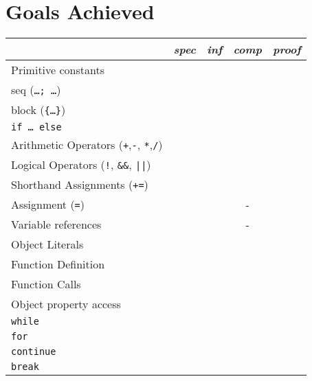 \documentclass{article}
\begin{document}
	\section{Goals Achieved}

	\begin{table}[ht]
		\begin{tabular}{lcccc}
		                                  & \textit{spec} & \textit{inf} & \textit{comp} &  \textit{proof} \\ 
		\hline
		Primitive constants               & \checkmark{}  & \checkmark{} & \checkmark{}  &  \checkmark{}   \\
		seq (\texttt{\ldots; \ldots})     & \checkmark{}  & \checkmark{} & \checkmark{}  &  \checkmark{}   \\
		block (\texttt{\{\ldots\}})     & \checkmark{}  & \checkmark{} & \checkmark{}  &  \checkmark{}   \\
		\texttt{if \ldots~else}           & \checkmark{}  & \checkmark{} & \checkmark{}  &  \checkmark{}   \\
		Arithmetic Operators 
			(\texttt{+},\texttt{-},
			\texttt{*},\texttt{/})        & \checkmark{}  & \checkmark{} & \checkmark{}  &  \checkmark{}   \\
		Logical Operators 
			(\texttt{!}, \texttt{\&{}\&},
				 \texttt{||})             & \checkmark{}  & \checkmark{} & \checkmark{}  &  \checkmark{}   \\
		Shorthand Assignments 
			(\texttt{+=})                 & \checkmark{}  & \checkmark{} & \checkmark{}  &  \checkmark{}   \\
		Assignment (\texttt{=})           & \checkmark{}  & \checkmark{} & -             &  \checkmark{}   \\
		Variable references               & \checkmark{}  & \checkmark{} & -             &  \checkmark{}   \\
		Object Literals                   & \checkmark{}  & \checkmark{} & \checkmark{}  &                 \\
		Function Definition               & \checkmark{}  & \checkmark{} & \checkmark{}  &                 \\
		Function Calls 		              & \checkmark{}  & \checkmark{} &               &                 \\
		Object property access            & \checkmark{}  & \checkmark{} & 	             &                 \\
		\texttt{while}                    &               &              &               &                 \\
		\texttt{for}                      &               &              &               &                 \\
		\texttt{continue}                 &               &              &               &                 \\
		\texttt{break}                    &               &              &               &                 \\
		\end{tabular}
	\end{table}
\end{document}
